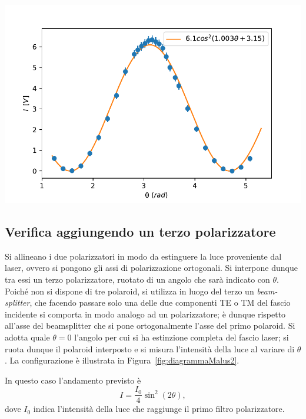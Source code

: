 \documentclass[10pt,oneside,a4paper]{article}
\newenvironment{Figure}
  {\par\medskip\noindent\minipage{\linewidth}}
  {\endminipage\par\medskip}
\begin{document}
\begin{multicols}{2}
\begin{Figure}
	\begin{center}
	\includegraphics[width=\linewidth]{malus1.pdf}
	\label{fig:malus1}
	\end{center}
\end{Figure}

\subsection{Verifica aggiungendo un terzo polarizzatore}

Si allineano i due polarizzatori in modo da estinguere la luce proveniente dal laser, ovvero si pongono gli assi di polarizzazione ortogonali. Si interpone dunque tra essi un terzo polarizzatore, ruotato di un angolo che sarà indicato con $\theta$. Poiché non si dispone di tre polaroid, si utilizza in luogo del terzo un \emph{beam-splitter}, che facendo passare solo una delle due componenti TE o TM del fascio incidente si comporta in modo analogo ad un polarizzatore; è dunque rispetto all'asse del beamsplitter che si pone ortogonalmente l'asse del primo polaroid. Si adotta quale $\theta = 0$ l'angolo per cui si ha estinzione completa del fascio laser; si ruota dunque il polaroid interposto e si misura l'intensità della luce al variare di $\theta$. La configurazione è illustrata in Figura~\ref{fig:diagrammaMalus2}.

In questo caso l'andamento previsto è
\begin{equation}\label{eq:Malus2}
I = \frac{I_0}{4}\sin^2(2\theta),
\end{equation}
dove $I_0$ indica l'intensità della luce che raggiunge il primo filtro polarizzatore.


\end{multicols}
\end{document}
